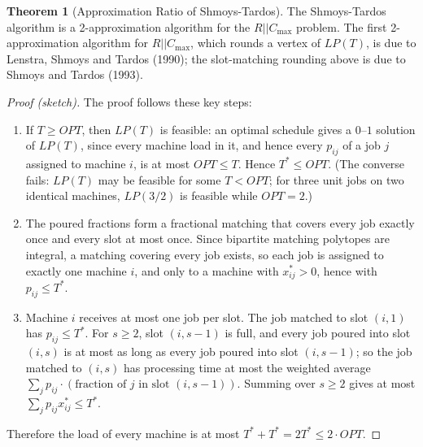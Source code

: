 \documentclass{article}
\theoremstyle{definition}
\newtheorem{theorem}{Theorem}
\begin{document}
\begin{theorem}[Approximation Ratio of Shmoys-Tardos]
The Shmoys-Tardos algorithm is a 2-approximation algorithm for the $R||C_{\max}$ problem. The first 2-approximation algorithm for $R||C_{\max}$, which rounds a vertex of $LP(T)$, is due to Lenstra, Shmoys and Tardos (1990); the slot-matching rounding above is due to Shmoys and Tardos (1993).
\begin{proof}[Proof (sketch)]
The proof follows these key steps:
\begin{enumerate}
    \item If $T \geq OPT$, then $LP(T)$ is feasible: an optimal schedule gives a $0$--$1$ solution of $LP(T)$, since every machine load in it, and hence every $p_{ij}$ of a job $j$ assigned to machine $i$, is at most $OPT \leq T$. Hence $T^* \leq OPT$. (The converse fails: $LP(T)$ may be feasible for some $T < OPT$; for three unit jobs on two identical machines, $LP(3/2)$ is feasible while $OPT = 2$.)
    \item The poured fractions form a fractional matching that covers every job exactly once and every slot at most once. Since bipartite matching polytopes are integral, a matching covering every job exists, so each job is assigned to exactly one machine $i$, and only to a machine with $x_{ij}^* > 0$, hence with $p_{ij} \leq T^*$.
    \item Machine $i$ receives at most one job per slot. The job matched to slot $(i,1)$ has $p_{ij} \leq T^*$. For $s \geq 2$, slot $(i,s-1)$ is full, and every job poured into slot $(i,s)$ is at most as long as every job poured into slot $(i,s-1)$; so the job matched to $(i,s)$ has processing time at most the weighted average $\sum_j p_{ij} \cdot (\text{fraction of } j \text{ in slot } (i,s-1))$. Summing over $s \geq 2$ gives at most $\sum_{j} p_{ij} x_{ij}^* \leq T^*$.
\end{enumerate}

Therefore the load of every machine is at most $T^* + T^* = 2T^* \leq 2 \cdot OPT$.
\end{proof}
\end{theorem}
\end{document}
